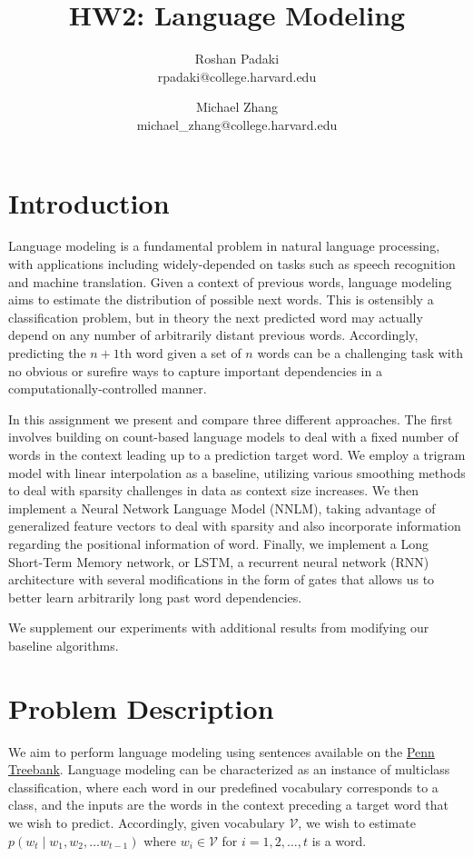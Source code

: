 \documentclass[11pt]{article}
\title{HW2: Language Modeling}
\author{Roshan Padaki \\ rpadaki@college.harvard.edu \and Michael Zhang \\ michael\_zhang@college.harvard.edu }
\begin{document}
\maketitle{}
\section{Introduction}

Language modeling is a fundamental problem in natural language processing, with applications including widely-depended on tasks such as speech recognition and machine translation. Given a context of previous words, language modeling aims to estimate the distribution of possible next words. This is ostensibly a classification problem, but in theory the next predicted word may actually depend on any number of arbitrarily distant previous words. Accordingly, predicting the $n+1$th word given a set of $n$ words can be a challenging task with no obvious or surefire ways to capture important dependencies in a computationally-controlled manner.

In this assignment we present and compare three different approaches. The first involves building on count-based language models to deal with a fixed number of words in the context leading up to a prediction target word. We employ a trigram model with linear interpolation as a baseline, utilizing various smoothing methods to deal with sparsity challenges in data as context size increases. We then implement a Neural Network Language Model (NNLM), taking advantage of generalized feature vectors to deal with sparsity and also incorporate information regarding the positional information of word. Finally, we implement a Long Short-Term Memory network, or LSTM, a recurrent neural network (RNN) architecture with several modifications in the form of gates that allows us to better learn arbitrarily long past word dependencies.

We supplement our experiments with additional results from modifying our baseline algorithms.

\section{Problem Description}
We aim to perform language modeling using sentences available on the \href{http://aclweb.org/anthology/J93-2004)}{Penn Treebank}. Language modeling can be characterized as an instance of multiclass classification, where each word in our predefined vocabulary corresponds to a class, and the inputs are the words in the context preceding a target word that we wish to predict. Accordingly, given vocabulary $\mathcal{V}$, we wish to estimate $p(w_t \mid w_1, w_2, \ldots w_{t-1})$ where $w_i \in \mathcal{V}$ for $i = 1, 2, \ldots, t$ is a word.
\end{document}
